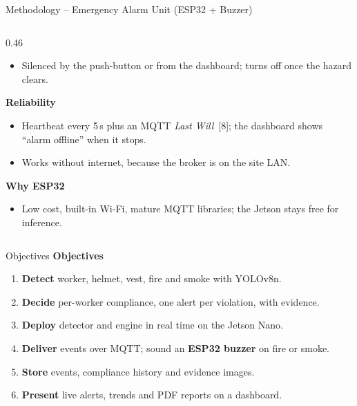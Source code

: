 \documentclass[aspectratio=169,10pt]{beamer}
\begin{document}
\begin{frame}{Methodology -- Emergency Alarm Unit (ESP32 + Buzzer)}
\begin{columns}[T]
\begin{column}{0.46\textwidth}
\begin{itemize}
        \item Silenced by the push-button or from the dashboard; turns off once the hazard clears.
      \end{itemize}
      \textbf{\small Reliability}
      \begin{itemize}
        \item Heartbeat every 5\,s plus an MQTT \emph{Last Will}~[8]; the dashboard shows
              ``alarm offline'' when it stops.
        \item Works without internet, because the broker is on the site LAN.
      \end{itemize}
      \textbf{\small Why ESP32}
      \begin{itemize}
        \item Low cost, built-in Wi-Fi, mature MQTT libraries; the Jetson stays free for inference.
      \end{itemize}
    \end{column}
  \end{columns}
\end{frame}

\begin{frame}{Objectives}
      \textbf{\small Objectives}
      \begin{enumerate}\small
        \item \textbf{Detect} worker, helmet, vest, fire and smoke with YOLOv8n.
        \item \textbf{Decide} per-worker compliance, one alert per violation, with evidence.
        \item \textbf{Deploy} detector and engine in real time on the Jetson Nano.
        \item \textbf{Deliver} events over MQTT; sound an \textbf{ESP32 buzzer} on fire or smoke.
        \item \textbf{Store} events, compliance history and evidence images.
        \item \textbf{Present} live alerts, trends and PDF reports on a dashboard.
      \end{enumerate}
\end{frame}
\end{document}
